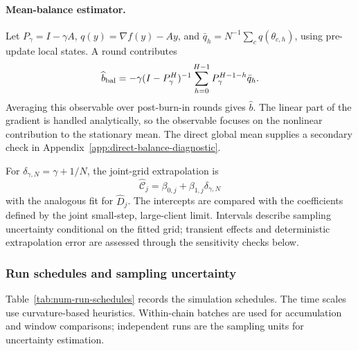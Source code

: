 \paragraph{Mean-balance estimator.}
Let $P_\gamma=I-\gamma A$, $q(y)=\nabla f(y)-Ay$, and
$\bar q_h=N^{-1}\sum_cq(\theta_{c,h})$, using pre-update local states.
A round contributes
\begin{equation}
\label{eq:num-balance-estimator}
 \widehat b_{\rm bal}
 =-\gamma(I-P_\gamma^H)^{-1}\sum_{h=0}^{H-1}P_\gamma^{H-1-h}\bar q_h.
\end{equation}
Averaging this observable over post-burn-in rounds gives $\widehat b$.
The linear part of the gradient is handled analytically, so the observable
focuses on the nonlinear contribution to the stationary mean. The direct
global mean supplies a secondary check in
Appendix~\ref{app:direct-balance-diagnostic}.

For $\delta_{\gamma,N}=\gamma+1/N$, the joint-grid extrapolation is
\begin{equation}
\label{eq:num-linear-fit}
 \widehat{\mathcal C}_j=\beta_{0,j}+\beta_{1,j}\delta_{\gamma,N}
\end{equation}
with the analogous fit for $\widehat D_j$. The intercepts are compared
with the coefficients defined by the joint small-step, large-client limit.
Intervals describe sampling uncertainty conditional on the fitted grid;
transient effects and deterministic extrapolation error are assessed
through the sensitivity checks below.

\subsubsection{Run schedules and sampling uncertainty}
\label{app:num-protocol-details}

Table~\ref{tab:num-run-schedules} records the simulation schedules.
The time scales use curvature-based heuristics. Within-chain batches are
used for accumulation and window comparisons; independent runs are the
sampling units for uncertainty estimation.

